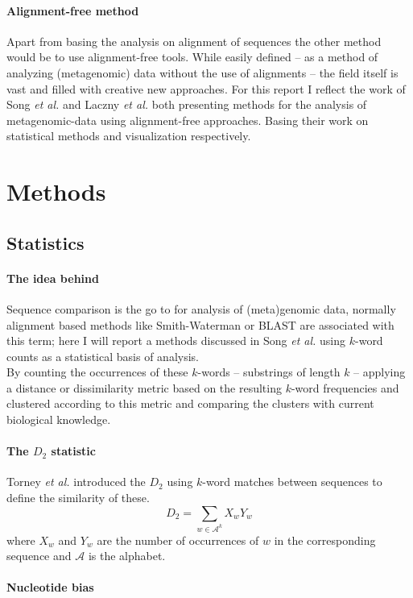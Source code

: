 \documentclass[twocolumn]{bmcart}%
\begin{document}
\paragraph*{Alignment-free method}
Apart from basing the analysis on alignment of sequences the other method would be to use alignment-free tools. While easily defined -- as a method of analyzing (metagenomic) data without the use of alignments -- the field itself is vast and filled with creative new approaches. For this report I reflect the work of Song \textit{et al.} \cite{doi:10.1093/bib/bbt067} and Laczny \textit{et al.} \cite{Laczny2014} both presenting methods for the analysis of metagenomic-data using alignment-free approaches. Basing their work on statistical methods and visualization respectively.
\section*{Methods}
\subsection*{Statistics}
\paragraph*{The idea behind}
Sequence comparison is the go to for analysis of (meta)genomic data, normally alignment based methods like Smith-Waterman or BLAST are associated with this term; here I will report a methods discussed in Song \textit{et al.}\cite{doi:10.1093/bib/bbt067} using $k$-word counts as a statistical basis of analysis.\\
By counting the occurrences of these $k$-words -- substrings of length $k$ -- applying a distance or dissimilarity metric based on the resulting $k$-word frequencies and clustered according to this metric and comparing the clusters with current biological knowledge. 
\paragraph*{The $D_2$ statistic}
Torney \textit{et al.}\cite{torney1990computation} introduced the $D_2$  using $k$-word matches between sequences to define the similarity of these.
$$D_2=\sum_{w\in \mathcal{A}^k}X_wY_w$$
where $X_w$ and $Y_w$ are the number of occurrences of $w$ in the corresponding sequence and $ \mathcal{A}$ is the alphabet.
\paragraph*{Nucleotide bias}
\end{document}

